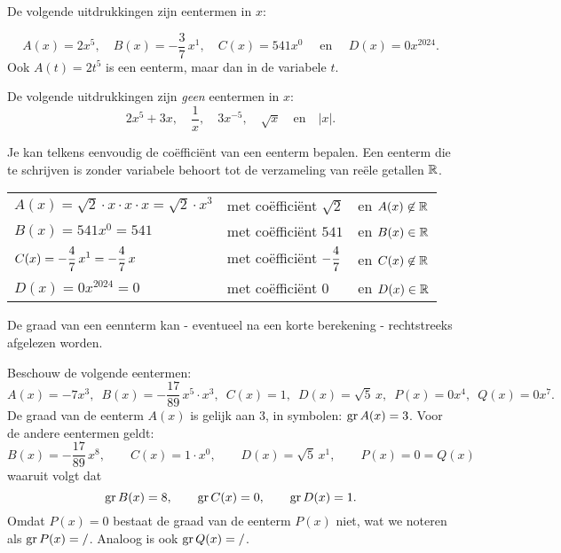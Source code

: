 \documentclass{ximera}
\begin{document}
\begin{example} 
De volgende uitdrukkingen zijn eentermen in $x$:
	
\[
A(x) = 2x^5, 
\quad B(x) = -\frac{3}{7}\,x^1, 
\quad C(x) = 541x^0 \quad \text{ en } 
\quad D(x) = 0x^{2024}.
\]
Ook $A(t) = 2t^5$ is een eenterm, maar dan in de variabele $t$. 
\end{example}

\begin{example}
De volgende uitdrukkingen zijn \textit{geen} eentermen in $x$:
\[
2x^5+3x, 
\quad \frac{1}{x}, 
\quad 3x^{-5}, 
\quad \sqrt{x} 
\quad \text{en} \quad \left|x\right|.
\] 
\end{example} 



Je kan telkens eenvoudig de coëfficiënt van een eenterm bepalen. Een eenterm die te schrijven is zonder variabele behoort tot de verzameling van reële getallen \(\mathbb{R}\). 



\begin{example} 
\begin{tabular}{lll}
 $A(x) = \sqrt{2}\cdot x \cdot x \cdot x = \sqrt{2}\cdot x^3$  & met coëfficiënt $\sqrt{2}$         & en $A(x) \not\in \mathbb{R}$ \\
 $B(x) = 541x^0 = 541$                                         & met coëfficiënt $541$              & en $B(x) \in \mathbb{R}$  \\
 $\displaystyle C(x) = -\frac{4}{7}\,x^1 = -\frac{4}{7}\,x$               & met coëfficiënt $\displaystyle -\frac{4}{7}$  & en $C(x) \not\in \mathbb{R}$ \\
 $D(x) = 0 x^{2024} = 0$                                       & met coëfficiënt $0$                & en $D(x) \in \mathbb{R}$  \\
\end{tabular}
\end{example} 


De graad van een eennterm kan - eventueel na een korte berekening - rechtstreeks afgelezen worden. 

\begin{example} 
Beschouw de volgende eentermen:
\[
A(x) = -7x^3, \,\,\, B(x) = -\frac{17}{89}\,x^5\cdot x^3, \,\,\, C(x) = 1, \,\,\, D(x) = \sqrt{5}\,x, \,\,\, P(x) = 0 x^4, \,\,\,  Q(x) = 0 x^7.
\]
De graad van de eenterm $A(x)$ is gelijk aan $3$, in symbolen: $\operatorname{gr} A(x) = 3$. 
Voor de andere eentermen geldt:  
\[
B(x) = -\frac{17}{89}\,x^8, \qquad C(x) = 1\cdot x^0, \qquad D(x) = \sqrt{5}\,x^1, \qquad P(x) = 0 = Q(x)
\]
waaruit volgt dat
\[
\operatorname{gr} B(x) = 8, \qquad \operatorname{gr} C(x) = 0, \qquad \operatorname{gr} D(x) = 1. 
\]
Omdat $P(x) = 0$ bestaat de graad van de eenterm $P(x)$ niet, wat we noteren als $\operatorname{gr} P(x) = /$. Analoog is ook $\operatorname{gr} Q(x) = /$.
\end{example} 
\end{document}
